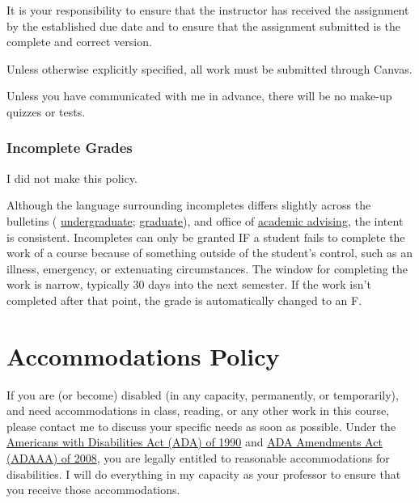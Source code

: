 It is your responsibility to ensure that the instructor has received the assignment by the established due date and to ensure that the assignment submitted is the complete and correct version.

Unless otherwise explicitly specified, all work must be submitted through Canvas.

Unless you have communicated with me in advance, there will be no make-up quizzes or tests.

\hypertarget{incomplete-grades}{%
\subsection{Incomplete Grades}\label{incomplete-grades}}

I did not make this policy.

Although the language surrounding incompletes differs slightly across the bulletins ( \href{https://bulletin.wfu.edu/undergraduate/procedures/exams-grading/\#:~:text=Incomplete\%20Grade}{undergraduate}; \href{https://bulletin.wfu.edu/graduate/procedures/grading/\#:~:text=Grade\%20of\%20I}{graduate}), and office of \href{https://advising.wfu.edu/academic-challenges/incompletes/}{academic advising}, the intent is consistent.
Incompletes can only be granted IF a student fails to complete the work of a course because of something outside of the student's control, such as an illness, emergency, or extenuating circumstances. The window for completing the work is narrow, typically 30 days into the next semester. If the work isn't completed after that point, the grade is automatically changed to an F.

\hypertarget{accommodations-policy}{%
\chapter{Accommodations Policy}\label{accommodations-policy}}

If you are (or become) disabled (in any capacity, permanently, or temporarily), and need accommodations in class, reading, or any other work in this course, please contact me to discuss your specific needs as soon as possible.
Under the \href{https://www.dol.gov/general/topic/disability/ada}{Americans with Disabilities Act (ADA) of 1990} and \href{https://en.wikipedia.org/wiki/ADA_Amendments_Act_of_2008}{ADA Amendments Act (ADAAA) of 2008}, you are legally entitled to reasonable accommodations for disabilities.
I will do everything in my capacity as your professor to ensure that you receive those accommodations.

